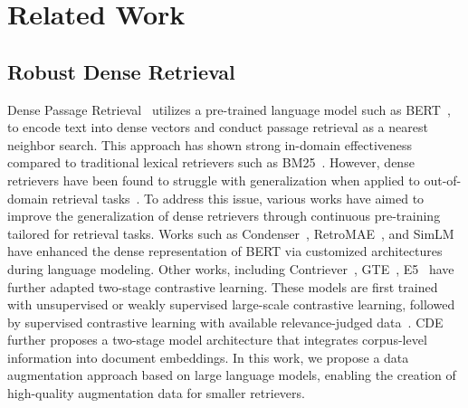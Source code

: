 \documentclass[]{fairmeta}
\begin{document}
\section{Related Work}
\subsection{Robust Dense Retrieval}
Dense Passage Retrieval~\citep{karpukhin-etal-2020-dense} utilizes a pre-trained language model such as BERT~\citep{devlin-etal-2019-bert}, to encode text into dense vectors and conduct passage retrieval as a nearest neighbor search.
This approach has shown strong in-domain effectiveness compared to traditional lexical retrievers such as BM25~\citep{robertson2009bm25}.
However, dense retrievers have been found to struggle with generalization when applied to out-of-domain retrieval tasks~\citep{thakur2021beir}.
To address this issue, various works have aimed to improve the generalization of dense retrievers through continuous pre-training tailored for retrieval tasks.
Works such as Condenser~\citep{gao-callan-2021-condenser}, RetroMAE~\citep{xiao-etal-2022-retromae}, and SimLM~\citep{wang-etal-2023-simlm} have enhanced the dense representation of BERT via customized architectures during language modeling.
Other works, including Contriever~\citep{izacard2022unsup}, GTE~\citep{li2023generaltextembeddingsmultistage}, E5~\citep{wang2024text} have further adapted two-stage contrastive learning.
These models are first trained with unsupervised or weakly supervised large-scale contrastive learning, followed by supervised contrastive learning with available relevance-judged data~\citep{nussbaum2024nomic, yu2024arcticembed}.
CDE~\citep{morris2024cde} further proposes a two-stage model architecture that integrates corpus-level information into document embeddings.
In this work, we propose a data augmentation approach based on large language models, enabling the creation of high-quality augmentation data for smaller retrievers.
\end{document}

